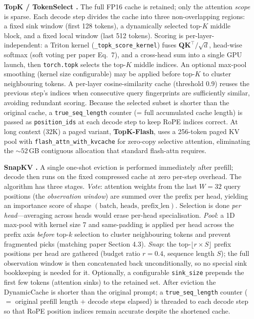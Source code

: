 \documentclass[conference]{IEEEtran}
\begin{document}
\textbf{TopK / TokenSelect \cite{tokenselect}.}  The full FP16 cache is
retained; only the attention \emph{scope} is sparse.  Each decode step
divides the cache into three non-overlapping regions: a fixed sink
window (first 128 tokens), a dynamically selected top-$K$ middle block,
and a fixed local window (last 512 tokens).  Scoring is
per-layer-independent: a Triton kernel (\texttt{\_topk\_score\_kernel})
fuses $\mathbf{Q}\mathbf{K}^\top / \sqrt{d}$, head-wise softmax (soft
voting per paper Eq.~7), and a cross-head sum into a single GPU launch,
then \texttt{torch.topk} selects the top-$K$ middle indices.  An
optional max-pool smoothing (kernel size configurable) may be applied
before top-$K$ to cluster neighbouring tokens.  A per-layer
cosine-similarity cache (threshold 0.9) reuses the previous step's
indices when consecutive query fingerprints are sufficiently similar,
avoiding redundant scoring.  Because the selected subset is shorter than
the original cache, a \texttt{true\_seq\_length} counter (= full
accumulated cache length) is passed as \texttt{position\_ids} at each
decode step to keep RoPE indices correct.  At long context (32K) a
paged variant, \textbf{TopK-Flash}, uses a 256-token paged KV pool with
\texttt{flash\_attn\_with\_kvcache} for zero-copy selective attention,
eliminating the ${\sim}52$\,GB contiguous allocation that standard
flash-attn requires.

\textbf{SnapKV \cite{snapkv}.}  A single one-shot eviction is performed
immediately after prefill; decode then runs on the fixed compressed
cache at zero per-step overhead.  The algorithm has three stages.
\emph{Vote}: attention weights from the last $W\!=\!32$ query positions
(the \emph{observation window}) are summed over the prefix per head,
yielding an importance score of shape
$(\text{batch},\,\text{heads},\,\text{prefix\_len})$.  Selection is
done \emph{per head}---averaging across heads would erase per-head
specialisation.  \emph{Pool}: a 1D max-pool with kernel size 7 and
same-padding is applied per head across the prefix axis \emph{before}
top-$k$ selection to cluster neighbouring tokens and prevent fragmented
picks (matching paper Section 4.3).  \emph{Snap}: the top-$\lfloor r
\times S \rfloor$ prefix positions per head are gathered (budget ratio
$r\!=\!0.4$, sequence length $S$); the full observation window is then
concatenated back unconditionally, so no special sink bookkeeping is
needed for it.  Optionally, a configurable \texttt{sink\_size} prepends
the first few tokens (attention sinks) to the retained set.  After
eviction the DynamicCache is shorter than the original prompt; a
\texttt{true\_seq\_length} counter ($=$ original prefill length $+$
decode steps elapsed) is threaded to each decode step so that RoPE
position indices remain accurate despite the shortened cache.
\end{document}

